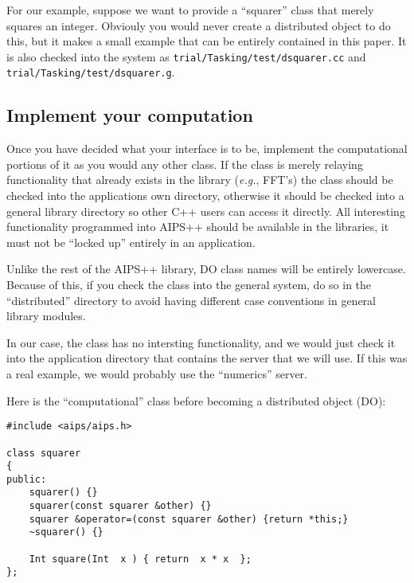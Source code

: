 For our example, suppose we want to provide a ``squarer'' class that
merely squares an integer. Obviouly you would never create a
distributed object to do this, but it makes a small example that can
be entirely contained in this paper. It is also checked into the
system as {\tt trial/Tasking/test/dsquarer.cc} and {\tt
trial/Tasking/test/dsquarer.g}.

\subsection{Implement your computation}

Once you have decided what your interface is to be, implement the
computational portions of it as you would any other class. If the class
is merely relaying functionality that already exists in the library
({\em e.g.}, FFT's) the class should be checked into the applications own
directory, otherwise it should be checked into a general library
directory so other C++ users can access it directly. All interesting
functionality programmed into AIPS++ should be available in the
libraries, it must not be ``locked up'' entirely in an application.

Unlike the rest of the AIPS++ library, DO class names will be entirely
lowercase. Because of this, if you check the class into the general
system, do so in the ``distributed'' directory to avoid having
different case conventions in general library modules.

In our case, the class has no intersting functionality, and we would
just check it into the application directory that contains the server
that we will use. If this was a real example, we would probably use
the ``numerics'' server.

Here is the ``computational'' class before becoming a distributed object
(DO):

\begin{verbatim}
#include <aips/aips.h>

class squarer
{
public:
    squarer() {}
    squarer(const squarer &other) {}
    squarer &operator=(const squarer &other) {return *this;}
    ~squarer() {}

    Int square(Int  x ) { return  x * x  };
};
\end{verbatim}

